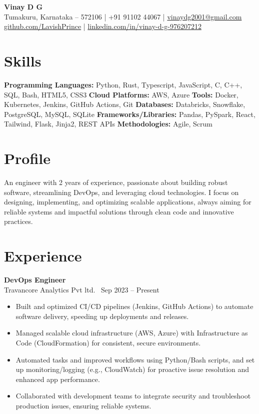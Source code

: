 \documentclass[a4paper]{article}
\begin{document}
\textbf{\Large Vinay D G} \\Tumakuru, Karnataka – 572106 \quad | \quad +91 91102 44067 \quad | \quad \href{mailto:vinaydg2001@gmail.com}{vinaydg2001@gmail.com} \\\href{https://github.com/LavishPrince}{github.com/LavishPrince} \quad | \quad \href{https://www.linkedin.com/in/vinay-d-g-976207212/}{linkedin.com/in/vinay-d-g-976207212}

\section*{Skills}
\textbf{Programming Languages:} Python, Rust, Typescript, JavaScript, C, C++, SQL, Bash, HTML5, CSS3
\textbf{Cloud Platforms:} AWS, Azure
\textbf{Tools:} Docker, Kubernetes, Jenkins, GitHub Actions, Git
\textbf{Databases:} Databricks, Snowflake, PostgreSQL, MySQL, SQLite
\textbf{Frameworks/Libraries:} Pandas, PySpark, React, Tailwind, Flask, Jinja2, REST APIs
\textbf{Methodologies:} Agile, Scrum

\section*{Profile}
An engineer with 2 years of experience, passionate about building robust software, streamlining DevOps, and leveraging cloud technologies. I focus on designing, implementing, and optimizing scalable applications, always aiming for reliable systems and impactful solutions through clean code and innovative practices.

\section*{Experience}
\textbf{DevOps Engineer} \\
Travancore Analytics Pvt ltd. \ \hfill Sep 2023 – Present
\begin{itemize}[leftmargin=0.25in, label=\textbullet]
    \item Built and optimized CI/CD pipelines (Jenkins, GitHub Actions) to automate software delivery, speeding up deployments and releases.
    \item Managed scalable cloud infrastructure (AWS, Azure) with Infrastructure as Code (CloudFormation) for consistent, secure environments.
    \item Automated tasks and improved workflows using Python/Bash scripts, and set up monitoring/logging (e.g., CloudWatch) for proactive issue resolution and enhanced app performance.
    \item Collaborated with development teams to integrate security and troubleshoot production issues, ensuring reliable systems.
\end{itemize}
\end{document}
